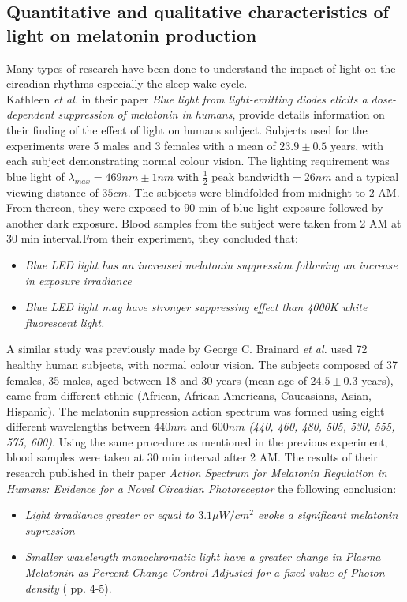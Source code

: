 \subsection{Quantitative and qualitative characteristics of light on melatonin production}
Many types of research have been done to understand the impact of light on the circadian rhythms especially the sleep-wake cycle. \\
Kathleen \textit{et al.} in their paper \textit{Blue light from light-emitting diodes elicits a dose-dependent suppression of melatonin in humans}\cite{bl2010}, provide details information on their finding of the effect of light on humans subject. Subjects used for the experiments were 5 males and 3 females with a mean of $23.9\pm0.5$ years, with each subject demonstrating normal colour vision. The lighting requirement was blue light of $\lambda_{max} = 469nm \pm 1nm $ with $\frac{1}{2}$ peak bandwidth$ = 26nm$ and a typical viewing distance of $35cm$. The subjects were blindfolded from midnight to 2 AM. From thereon, they were exposed to 90 min of blue light exposure followed by another dark exposure. Blood samples from the subject were taken from 2 AM at 30 min interval.From their experiment, they concluded that:
\begin{itemize}
\item \textit{Blue LED light has an increased melatonin suppression following an increase in exposure irradiance}
\item \textit{Blue LED light may have stronger suppressing effect than 4000K white fluorescent light.}
\end{itemize}
A similar study was previously made by George C. Brainard \textit{et al.} \cite{ac2001} used 72 healthy human subjects, with normal colour vision. The subjects composed of 37 females, 35 males, aged between 18 and 30 years (mean age of $24.5 \pm 0.3$ years), came from different ethnic (African, African Americans, Caucasians, Asian, Hispanic). The melatonin suppression action spectrum was formed using eight different wavelengths between $440nm$ and $600nm$ \textit{(440, 460, 480, 505, 530, 555, 575, 600)}. Using the same procedure as mentioned in the previous experiment, blood samples were taken at 30 min interval after 2 AM. The results of their research published in their paper \textit{Action Spectrum for Melatonin Regulation in Humans: Evidence for a Novel Circadian Photoreceptor} the following conclusion:
\begin{itemize}
\item \textit{Light irradiance greater or equal to $3.1 \mu W/cm^{2}$ evoke a significant melatonin supression}
\item \textit{Smaller wavelength monochromatic light have a greater change in \textit{Plasma Melatonin as Percent Change Control-Adjusted} for a fixed value of \textit{Photon density}} (\cite{ac2001} pp. 4-5).
\end{itemize}   


